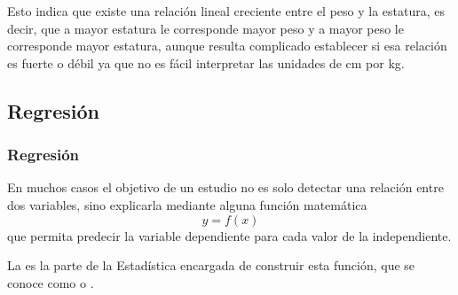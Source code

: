 \begin{frame}
{Esto indica que existe una relación lineal creciente entre el peso y la estatura, es decir, que a mayor estatura le corresponde mayor peso
y a mayor peso le corresponde mayor estatura, aunque resulta complicado establecer si esa relación es fuerte o débil ya que no es fácil
interpretar las unidades de cm por kg.}
\end{frame}


\subsection{Regresión}
\begin{frame}
\frametitle{Regresión}
En muchos casos el objetivo de un estudio no es solo detectar una relación entre dos variables, sino explicarla mediante alguna función matemática
\[y=f(x)\]
que permita predecir la variable dependiente para cada valor de la independiente.

La  es la parte de la Estadística encargada de construir esta función, que se conoce como  o .

\end{frame}


